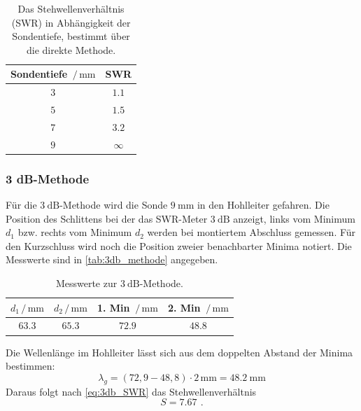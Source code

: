 \begin{table}
    \centering
    \caption{Das Stehwellenverhältnis (SWR) in Abhängigkeit der Sondentiefe, bestimmt über die direkte Methode.}
    \label{tab:direkte_methode}
    \begin{tabular}{c c}
        \toprule
        Sondentiefe $\,/\, \si{\milli\metre}$ & SWR\\
        \midrule
        $3$ & $1.1$ \\
        $5$ & $1.5$ \\
        $7$ & $3.2$ \\
        $9$ & $\infty$ \\
        \bottomrule
    \end{tabular}
\end{table}
\FloatBarrier

\subsubsection{3 dB-Methode}
Für die $\SI{3}{\dB}$-Methode wird die Sonde $\SI{9}{\milli\metre}$ in den Hohlleiter gefahren.
Die Position des Schlittens bei der das SWR-Meter $\SI{3}{\dB}$ anzeigt, links vom Minimum $d_1$ bzw. rechts vom Minimum $d_2$ werden bei montiertem Abschluss gemessen.
Für den Kurzschluss wird noch die Position zweier benachbarter Minima notiert.
Die Messwerte sind in \autoref{tab:3db_methode} angegeben.

\begin{table}
    \centering
    \caption{Messwerte zur $\SI{3}{\dB}$-Methode.}
    \label{tab:3db_methode}
    \begin{tabular}{c c c c}
        \toprule
        $d_1 \,/\, \si{\milli\metre}$ & $d_2 \,/\, \si{\milli\metre}$ & 1. Min $\,/\, \si{\milli\metre}$ & 2. Min $\,/\, \si{\milli\metre}$ \\
        \midrule
        $63.3$ & $65.3$ & $72.9$ & $48.8$ \\
        \bottomrule
    \end{tabular}
\end{table}
\FloatBarrier

Die Wellenlänge im Hohlleiter lässt sich aus dem doppelten Abstand der Minima bestimmen:
\begin{equation*}
    \lambda_g = (72,9 - 48,8) \cdot 2 \, \si{\milli\metre} = \SI{48.2}{\milli\metre}
\end{equation*}
Daraus folgt nach \autoref{eq:3db_SWR} das Stehwellenverhältnis
\begin{equation}
    S = \SI{7.67}{} \, .
\end{equation}

